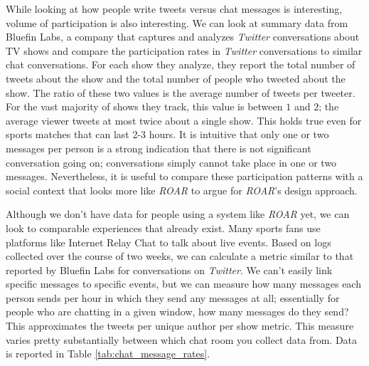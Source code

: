 
While looking at how people write tweets versus chat messages is interesting, volume of participation is also interesting. We can look at summary data from Bluefin Labs, a company that captures and analyzes \emph{Twitter} conversations about TV shows and compare the participation rates in \emph{Twitter} conversations to similar chat conversations. For each show they analyze, they report the total number of tweets about the show and the total number of people who tweeted about the show. The ratio of these two values is the average number of tweets per tweeter. For the vast majority of shows they track, this value is between $1$ and $2$; the average viewer tweets at most twice about a single show. This holds true even for sports matches that can last 2-3 hours. It is intuitive that only one or two messages per person is a strong indication that there is not significant conversation going on; conversations simply cannot take place in one or two messages. Nevertheless, it is useful to compare these participation patterns with a social context that looks more like \emph{ROAR} to argue for \emph{ROAR}'s design approach.


Although we don't have data for people using a system like \emph{ROAR} yet, we can look to comparable experiences that already exist. Many sports fans use platforms like Internet Relay Chat to talk about live events. Based on logs collected over the course of two weeks, we can calculate a metric similar to that reported by Bluefin Labs for conversations on \emph{Twitter}. We can't easily link specific messages to specific events, but we can measure how many messages each person sends per hour in which they send any messages at all; essentially for people who are chatting in a given window, how many messages do they send? This approximates the tweets per unique author per show metric. This measure varies pretty substantially between which chat room you collect data from. Data is reported in Table \ref{tab:chat_message_rates}. 



